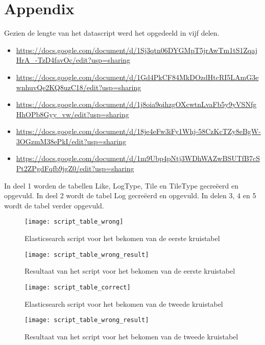 \chapter{Appendix}
\label{ch:appendix}

Gezien de lengte van het datascript werd het opgedeeld in vijf delen.

\begin{itemize}
	\label{app:datascript}
	\item \url{https://docs.google.com/document/d/1Sj3qtn06DYGMpT5jrAwTm1tS1ZqajHrA_-TzD4favOc/edit?usp=sharing}
	\item \url{https://docs.google.com/document/d/1Gd4PkCF84MkDOzdHtcRI5LAmG3ewnhuvQe2KQ8uzC18/edit?usp=sharing}
	\item \url{https://docs.google.com/document/d/1j8oia9qihzgOXcwtnLvaFb5y9yVSNfgHhOPb8Gyy_vw/edit?usp=sharing}
	\item \url{https://docs.google.com/document/d/18je4eFw3iFy1Whj-58CzKcTZy8eBgW-3OGzmM38ePkI/edit?usp=sharing}
	\item \url{https://docs.google.com/document/d/1m9Ubp4pNtj3WDhWAZwBSUTfB7cSPt2ZPgdFqfb9jgZ0/edit?usp=sharing}
\end{itemize}

In deel 1 worden de tabellen Like, LogType, Tile en TileType gecreëerd en opgevuld.
In deel 2 wordt de tabel Log gecreëerd en opgevuld.
In delen 3, 4 en 5 wordt de tabel verder opgevuld.

\begin{figure}
	\centering
	\texttt{[image: script\_table\_wrong]}
	\caption{Elasticsearch script voor het bekomen van de eerste kruistabel}
	\label{app:eersteKruistabel}
\end{figure}

\begin{figure}
	\centering
	\texttt{[image: script\_table\_wrong\_result]}
	\caption{Resultaat van het script voor het bekomen van de eerste kruistabel}
	\label{app:eersteKruistabelResult}
\end{figure}

\begin{figure}
	\centering
	\texttt{[image: script\_table\_correct]}
	\caption{Elasticsearch script voor het bekomen van de tweede kruistabel}
	\label{app:tweedeKruistabel}
\end{figure}

\begin{figure}
	\centering
	\texttt{[image: script\_table\_wrong\_result]}
	\caption{Resultaat van het script voor het bekomen van de tweede kruistabel}
	\label{app:tweedeKruistabelResult}	
\end{figure}